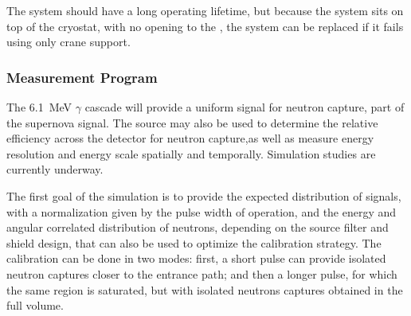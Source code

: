 The system should have a long operating lifetime, but because the  system sits on top of the cryostat, with no opening to the , the system can be replaced if it fails using only crane support.


\subsubsection{Measurement Program}
\label{sec:sp-calib-sys-pns-meas}

The \SI{6.1}{\MeV} $\gamma$ cascade will provide a uniform signal for neutron capture, part of the supernova signal. The source may also be used to determine the relative efficiency across the detector for neutron capture,as well as measure energy resolution and energy scale spatially and temporally. Simulation studies are currently underway.


The first goal of the simulation is to provide the expected distribution of signals, with a normalization given by the pulse width of  operation, and the energy and angular correlated distribution of neutrons, depending on the source filter and shield design, that can also be used to optimize the calibration strategy.
The calibration can be done in two modes: first, a short  pulse can provide isolated neutron captures closer to the entrance path; and then a longer  pulse, for which the same region is saturated, but with isolated neutrons captures obtained in the full volume.

